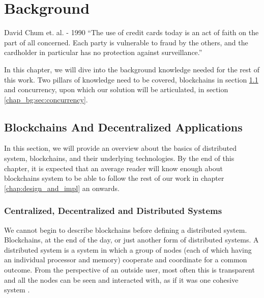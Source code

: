 \chapter{Background} \label{chap:background}


\ifpdf
    \graphicspath{{7/figures/PNG/}{7/figures/PDF/}{7/figures/}}
\else
    \graphicspath{{7/figures/EPS/}{7/figures/}}
\fi
%

\begin{chapquote}{David Chum et. al. - 1990}
``The use of credit cards today is an act of faith on the part of all concerned. Each party is
vulnerable to fraud by the others, and the cardholder in particular has no protection against
surveillance.''
\end{chapquote}


In this chapter, we will dive into the background knowledge needed for the rest of this work. Two
pillars of knowledge need to be covered, blockchains in section \ref{chap_bg:sec:blockchains} and
concurrency, upon which our solution will be articulated, in section \ref{chap_bg:sec:concurrency}.

\section{Blockchains And Decentralized Applications} \label{chap_bg:sec:blockchains}

In this section, we will provide an overview about the basics of distributed system, blockchains,
and their underlying technologies. By the end of this chapter, it is expected that an average reader
will know enough about blockchains system to be able to follow the rest of our work in chapter
\ref{chap:design_and_impl} an onwards.

\subsection{Centralized, Decentralized and Distributed Systems}

We cannot begin to describe blockchains before defining a distributed system. Blockchains, at the
end of the day, or just another form of distributed systems. A distributed system is a system in
which a group of nodes (each of which having an individual processor and memory) cooperate and
coordinate for a common outcome. From the perspective of an outside user, most often this is
transparent and all the nodes can be seen and interacted with, as if it was one cohesive system
\cite{mastering_blockchain}.

